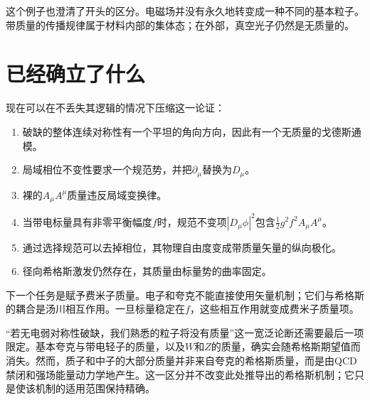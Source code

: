 这个例子也澄清了开头的区分。电磁场并没有永久地转变成一种不同的基本粒子。带质量的传播规律属于材料内部的集体态；在外部，真空光子仍然是无质量的。

\section{已经确立了什么}

现在可以在不丢失其逻辑的情况下压缩这一论证：
\begin{enumerate}
  \item 破缺的整体连续对称性有一个平坦的角向方向，因此有一个无质量的戈德斯通模。
  \item 局域相位不变性要求一个规范势，并把\(\partial_\mu\)替换为\(D_\mu\)。
  \item 裸的\(A_\mu A^\mu\)质量违反局域变换律。
  \item 当带电标量具有非零平衡幅度\(f\)时，规范不变项\(|D_\mu\phi|^2\)包含\(\frac12g^2f^2A_\mu A^\mu\)。
  \item 通过选择规范可以去掉相位，其物理自由度变成带质量矢量的纵向极化。
  \item 径向希格斯激发仍然存在，其质量由标量势的曲率固定。
\end{enumerate}

下一个任务是赋予费米子质量。电子和夸克不能直接使用矢量机制；它们与希格斯的耦合是汤川相互作用。一旦标量稳定在\(f\)，这些相互作用就变成费米子质量项。

“若无电弱对称性破缺，我们熟悉的粒子将没有质量”这一宽泛论断还需要最后一项限定。基本夸克与带电轻子的质量，以及\(W\)和\(Z\)的质量，确实会随希格斯期望值而消失。然而，质子和中子的大部分质量并非来自夸克的希格斯质量，而是由QCD禁闭和强场能量动力学地产生。这一区分并不改变此处推导出的希格斯机制；它只是使该机制的适用范围保持精确。